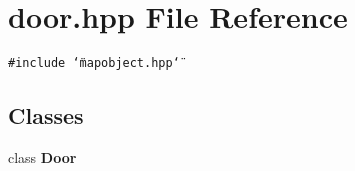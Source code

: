 \section{door.hpp File Reference}
\label{door_8hpp}
{\tt \#include \char`\"{}mapobject.hpp\char`\"{}}\par
\subsection*{Classes}
\begin{CompactItemize}
\item 
class {\bf Door}
\end{CompactItemize}
